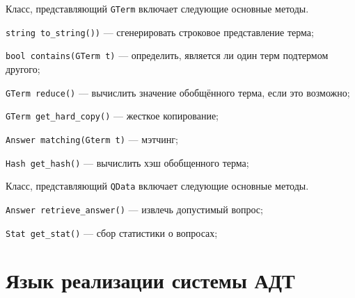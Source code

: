 Класс, представляющий \texttt{GTerm} включает следующие основные методы.
\begin{description}
  \item{\texttt{string to\_string())}} --- сгенерировать строковое представление терма;
  \item{\texttt{bool contains(GTerm t)}} --- определить, является ли один терм подтермом другого;
  \item{\texttt{GTerm reduce()}} --- вычислить значение обобщённого терма, если это возможно;
  \item{\texttt{GTerm get\_hard\_copy()}} --- жесткое копирование;
  \item{\texttt{Answer matching(Gterm t)}} --- мэтчинг;
  \item{\texttt{Hash get\_hash()}} --- вычислить хэш обобщенного терма;
\end{description}

Класс, представляющий \texttt{QData} включает следующие основные методы.
\begin{description}
  \item{\texttt{Answer retrieve\_answer()}} --- извлечь допустимый вопрос;
  \item{\texttt{Stat get\_stat()}} --- сбор статистики о вопросах;
\end{description}


\section{Язык реализации системы АДТ}

